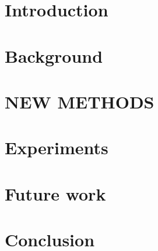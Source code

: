 \documentclass[12pt,twoside,onecolumn]{article}
\begin{document}
\section{Introduction}
\newpage

\section{Background}

\newpage

\section{NEW METHODS}
\newpage

\section{Experiments}
\newpage

\section{Future work}
\newpage

\section{Conclusion}
\newpage



\end{document}
